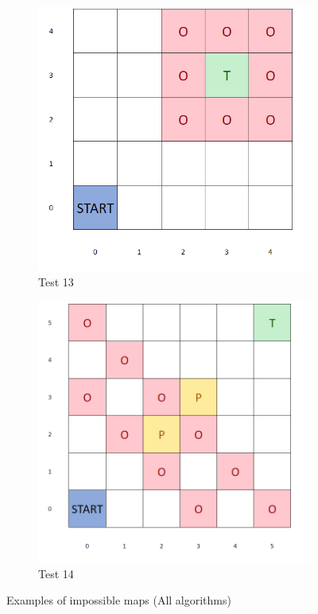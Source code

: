 \documentclass{article}
\begin{document}
\begin{figure}[H]
   	 \centering
     \begin{subfigure}[b]{0.40\textwidth}
         \centering
         \includegraphics[width=\textwidth]{images/test13.png}
         \caption{Test 13}
         \label{fig:test13}
     \end{subfigure}
     \hfill
     \begin{subfigure}[b]{0.41\textwidth}
         \centering
         \includegraphics[width=\textwidth]{images/test14.png}
         \caption{Test 14}
         \label{fig:test14}
     \end{subfigure}
     \caption{Examples of impossible maps (All algorithms)}
\end{figure}
\end{document}
